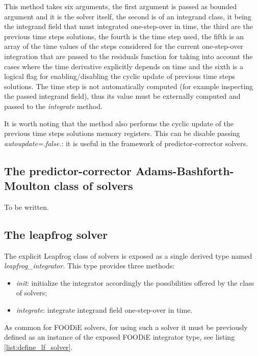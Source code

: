 \documentclass[pdftex,preprint,3p,times,numbers]{elsarticle}
\begin{document}
This method takes six arguments, the first argument is passed as bounded argument and it is the solver itself, the second is of an integrand class, it being the integrand field that must integrated one-step-over in time, the third are the previous time steps solutions, the fourth is the time step used, the fifth is an array of the time values of the steps considered for the current one-step-over integration that are passed to the residuals function for taking into account the cases where the time derivative explicitly depends on time and the sixth is a logical flag for enabling/disabling the cyclic update of previous time steps solutions. The time step is not automatically computed (for example inspecting the passed integrand field), thus its value must be externally computed and passed to the \emph{integrate} method.

It is worth noting that the method also performs the cyclic update of the previous time steps solutions memory registers. This can be disable passing \emph{autoupdate=.false.}: it is useful in the framework of predictor-corrector solvers.

\subsection{The predictor-corrector Adams-Bashforth-Moulton class of solvers}\label{subsec:solver_abm}

{\color{red} To be written.}

\subsection{The leapfrog solver}\label{subsec:solver_leapfrog}

The explicit Leapfrog class of solvers is exposed as a single derived type named \emph{leapfrog\_integrator}. This type provides three methods:

\begin{itemize}
  \item \emph{init}: initialize the integrator accordingly the possibilities offered by the class of solvers;
  \item \emph{integrate}: integrate integrand field one-step-over in time.
  \end{itemize}

As common for FOODiE solvers, for using such a solver it must be previously defined as an instance of the exposed FOODiE integrator type, see listing \ref{list:define_lf_solver}.
\end{document}
